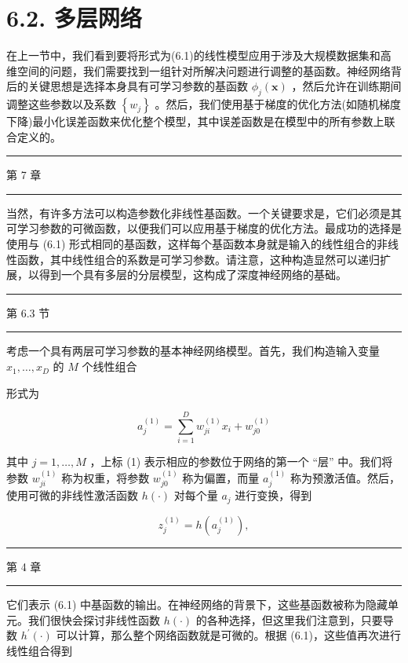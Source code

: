\documentclass[10pt]{report}
\newcommand{\HRule}{\begin{center}\rule{0.9\linewidth}{0.2mm}\end{center}}
\begin{document}
\section*{6.2. 多层网络}

在上一节中，我们看到要将形式为(6.1)的线性模型应用于涉及大规模数据集和高维空间的问题，我们需要找到一组针对所解决问题进行调整的基函数。神经网络背后的关键思想是选择本身具有可学习参数的基函数 \({\phi }_{j}\left( \mathbf{x}\right)\) ，然后允许在训练期间调整这些参数以及系数 \(\left\{  {w}_{j}\right\}\) 。然后，我们使用基于梯度的优化方法(如随机梯度下降)最小化误差函数来优化整个模型，其中误差函数是在模型中的所有参数上联合定义的。

\HRule

第 7 章

\HRule

当然，有许多方法可以构造参数化非线性基函数。一个关键要求是，它们必须是其可学习参数的可微函数，以便我们可以应用基于梯度的优化方法。最成功的选择是使用与 (6.1) 形式相同的基函数，这样每个基函数本身就是输入的线性组合的非线性函数，其中线性组合的系数是可学习参数。请注意，这种构造显然可以递归扩展，以得到一个具有多层的分层模型，这构成了深度神经网络的基础。

\HRule

第 6.3 节

\HRule

考虑一个具有两层可学习参数的基本神经网络模型。首先，我们构造输入变量 \({x}_{1},\ldots ,{x}_{D}\) 的 \(M\) 个线性组合

形式为

\[
{a}_{j}^{\left( 1\right) } = \mathop{\sum }\limits_{{i = 1}}^{D}{w}_{ji}^{\left( 1\right) }{x}_{i} + {w}_{j0}^{\left( 1\right) } \tag{6.7}
\]

其中 \(j = 1,\ldots ,M\) ，上标 (1) 表示相应的参数位于网络的第一个 “层” 中。我们将参数 \({w}_{ji}^{\left( 1\right) }\) 称为权重，将参数 \({w}_{j0}^{\left( 1\right) }\) 称为偏置，而量 \({a}_{j}^{\left( 1\right) }\) 称为预激活值。然后，使用可微的非线性激活函数 \(h\left( \cdot \right)\) 对每个量 \({a}_{j}\) 进行变换，得到

\[
{z}_{j}^{\left( 1\right) } = h\left( {a}_{j}^{\left( 1\right) }\right) , \tag{6.8}
\]

\HRule

第 4 章

\HRule

它们表示 (6.1) 中基函数的输出。在神经网络的背景下，这些基函数被称为隐藏单元。我们很快会探讨非线性函数 \(h\left( \cdot \right)\) 的各种选择，但这里我们注意到，只要导数 \({h}^{\prime }\left( \cdot \right)\) 可以计算，那么整个网络函数就是可微的。根据 (6.1)，这些值再次进行线性组合得到
\end{document}
